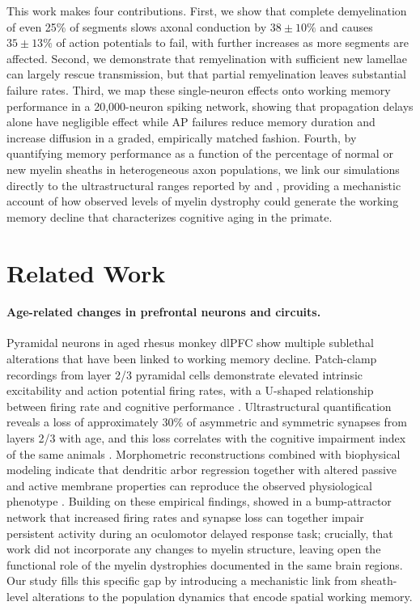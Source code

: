 This work makes four contributions. First, we show that complete demyelination of even 25\% of segments slows axonal conduction by $38 \pm 10\%$ and causes $35 \pm 13\%$ of action potentials to fail, with further increases as more segments are affected. Second, we demonstrate that remyelination with sufficient new lamellae can largely rescue transmission, but that partial remyelination leaves substantial failure rates. Third, we map these single-neuron effects onto working memory performance in a 20{,}000-neuron spiking network, showing that propagation delays alone have negligible effect while AP failures reduce memory duration and increase diffusion in a graded, empirically matched fashion. Fourth, by quantifying memory performance as a function of the percentage of normal or new myelin sheaths in heterogeneous axon populations, we link our simulations directly to the ultrastructural ranges reported by \citet{peters2002aging} and \citet{peters2003remyelination}, providing a mechanistic account of how observed levels of myelin dystrophy could generate the working memory decline that characterizes cognitive aging in the primate.

\section{Related Work}

\paragraph{Age-related changes in prefrontal neurons and circuits.}
Pyramidal neurons in aged rhesus monkey dlPFC show multiple sublethal alterations that have been linked to working memory decline. Patch-clamp recordings from layer 2/3 pyramidal cells demonstrate elevated intrinsic excitability and action potential firing rates, with a U-shaped relationship between firing rate and cognitive performance \citep{chang2005firing}. Ultrastructural quantification reveals a loss of approximately 30\% of asymmetric and symmetric synapses from layers 2/3 with age, and this loss correlates with the cognitive impairment index of the same animals \citep{peters2008synapses,dickstein2013spines}. Morphometric reconstructions combined with biophysical modeling indicate that dendritic arbor regression together with altered passive and active membrane properties can reproduce the observed physiological phenotype \citep{coskren2015aging,rumbell2016automated}. Building on these empirical findings, \citet{ibanez2020network} showed in a bump-attractor network that increased firing rates and synapse loss can together impair persistent activity during an oculomotor delayed response task; crucially, that work did not incorporate any changes to myelin structure, leaving open the functional role of the myelin dystrophies documented in the same brain regions. Our study fills this specific gap by introducing a mechanistic link from sheath-level alterations to the population dynamics that encode spatial working memory.

